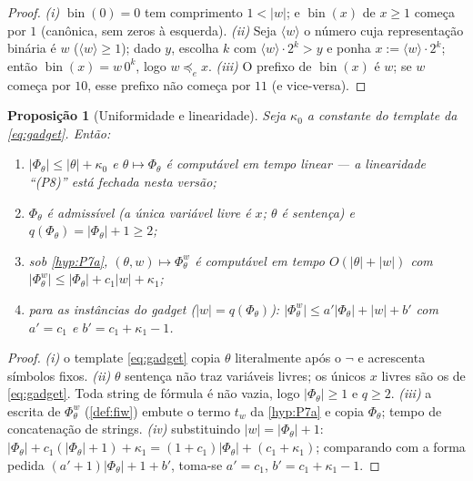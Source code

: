 \documentclass[11pt,a4paper]{article}
\newtheorem{proposition}[theorem]{Proposição}
\theoremstyle{definition}
\theoremstyle{remark}
\begin{document}
\begin{proof}
\emph{(i)} $\operatorname{bin}(0) = 0$ tem comprimento
$1 < \lvert w\rvert$; e $\operatorname{bin}(x)$ de $x \geq 1$ começa por $1$
(canônica, sem zeros à esquerda). \emph{(ii)} Seja $\langle w \rangle$ o
número cuja representação binária é $w$ ($\langle w \rangle \geq 1$); dado
$y$, escolha $k$ com $\langle w \rangle \cdot 2^{k} > y$ e ponha
$x := \langle w \rangle \cdot 2^{k}$; então
$\operatorname{bin}(x) = w\,0^{k}$, logo $w \preceq_{e} x$. \emph{(iii)} O
prefixo de $\operatorname{bin}(x)$ é $w$; se $w$ começa por $10$, esse prefixo
não começa por $11$ (e vice-versa).
\end{proof}

\begin{proposition}[Uniformidade e linearidade]\label{prop:uniformidade}
Seja $\kappa_{0}$ a constante do template da \cref{eq:gadget}. Então:
\begin{enumerate}
\item[\emph{(i)}] $\lvert\Phi_\theta\rvert \leq \lvert\theta\rvert + \kappa_{0}$
  e $\theta \mapsto \Phi_\theta$ é computável em tempo linear --- a
  linearidade ``(P8)'' está \emph{fechada} nesta versão;
\item[\emph{(ii)}] $\Phi_\theta$ é admissível (a única variável livre é $x$;
  $\theta$ é sentença) e $q(\Phi_\theta) = \lvert\Phi_\theta\rvert + 1 \geq 2$;
\item[\emph{(iii)}] sob \cref{hyp:P7a}, $(\theta, w) \mapsto \Phi_\theta^{w}$
  é computável em tempo $O(\lvert\theta\rvert + \lvert w\rvert)$ com
  $\lvert\Phi_\theta^{w}\rvert \leq
  \lvert\Phi_\theta\rvert + c_{1}\lvert w\rvert + \kappa_{1}$;
\item[\emph{(iv)}] para as instâncias do gadget
  ($\lvert w\rvert = q(\Phi_\theta)$):
  $\lvert\Phi_\theta^{w}\rvert \leq a'\lvert\Phi_\theta\rvert + \lvert w\rvert + b'$
  com $a' = c_{1}$ e $b' = c_{1} + \kappa_{1} - 1$.
\end{enumerate}
\end{proposition}

\begin{proof}
\emph{(i)} o template \eqref{eq:gadget} copia $\theta$ literalmente após o
$\neg$ e acrescenta símbolos fixos. \emph{(ii)} $\theta$ sentença não traz
variáveis livres; os únicos $x$ livres são os de \eqref{eq:gadget}. Toda
string de fórmula é não vazia, logo $\lvert\Phi_\theta\rvert \geq 1$ e
$q \geq 2$. \emph{(iii)} a escrita de $\Phi_\theta^{w}$ (\cref{def:fiw})
embute o termo $t_{w}$ da \cref{hyp:P7a} e copia $\Phi_\theta$; tempo de
concatenação de strings. \emph{(iv)} substituindo
$\lvert w\rvert = \lvert\Phi_\theta\rvert + 1$:
$\lvert\Phi_\theta\rvert + c_{1}(\lvert\Phi_\theta\rvert + 1) + \kappa_{1}
= (1 + c_{1})\lvert\Phi_\theta\rvert + (c_{1} + \kappa_{1})$; comparando com a
forma pedida $(a' + 1)\lvert\Phi_\theta\rvert + 1 + b'$, toma-se
$a' = c_{1}$, $b' = c_{1} + \kappa_{1} - 1$.
\end{proof}
\end{document}
